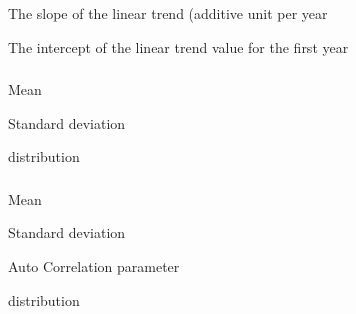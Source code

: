  {The slope of the linear trend (additive unit per year}

 {The intercept of the linear trend value for the first year}

\subsubsection[Random Draw]{}

 {Mean}

 {Standard deviation}

 {distribution}

\subsubsection[Random Walk]{}

 {Mean}

 {Standard deviation}

 {Auto Correlation parameter}

 {distribution}

